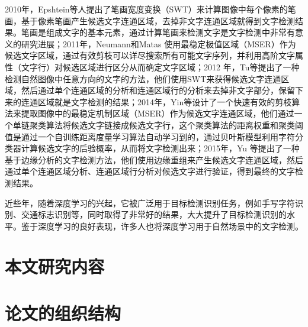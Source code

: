     2010年，Epshtein\cite{Epshtein2010Detecting}等人提出了笔画宽度变换（SWT）来计算图像中每个像素的笔画，基于像素笔画产生候选文字连通区域，去掉非文字连通区域就得到文字检测结果。笔画是组成文字的基本元素，通过计算笔画来检测文字是文字检测中非常有意义的研究进展；2011年，Neumann和Matas\cite{Neumann2011Text} 使用最稳定极值区域（MSER）作为候选文字区域，通过有效剪枝可以详尽搜索所有可能文字序列，并利用高阶文字属性（文字行）对候选区域进行区分从而确定文字区域；2012 年，Tu\cite{Tu2012Detecting}等提出了一种检测自然图像中任意方向的文字的方法，他们使用SWT来获得候选文字连通区域，然后通过单个连通区域的分析和连通区域行的分析来去掉非文字部分，保留下来的连通区域就是文字检测的结果；2014年，Yin\cite{Yin2013Robust}等设计了一个快速有效的剪枝算法来提取图像中的最稳定机制区域（MSER）作为候选文字连通区域，他们通过一个单链聚类算法将候选文字链接成候选文字行，这个聚类算法的距离权重和聚类阈值是通过一个自训练距离度量学习算法自动学习到的，通过贝叶斯模型利用字符分类器计算候选文字的后验概率，从而将文字检测出来；2015年，Yu\cite{Yu2015Text} 等提出了一种基于边缘分析的文字检测方法，他们使用边缘重组来产生候选文字连通区域，然后通过单个连通区域分析、连通区域行分析对候选文字进行验证，得到最终的文字检测结果。
    
    近些年，随着深度学习\cite{Moral2010Foundations}的兴起，它被广泛用于目标检测识别任务，例如手写字符识别、交通标志识别等，同时取得了非常好的结果，大大提升了目标检测识别的水平。鉴于深度学习的良好表现，许多人也将深度学习用于自然场景中的文字检测。

    \section{本文研究内容}

    \section{论文的组织结构}


